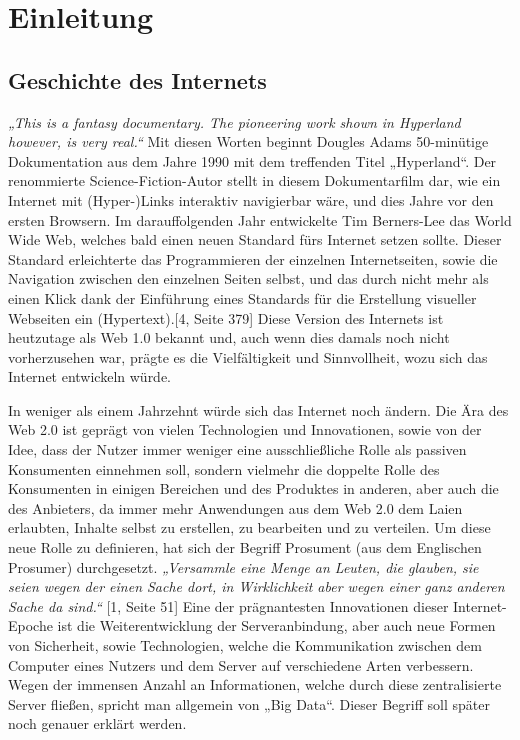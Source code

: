 \chapter{Einleitung}

\section{Geschichte des Internets}

\textit{„This is a fantasy documentary. The pioneering work shown in Hyperland however, is very real.“} \cite{Hyperland}
Mit diesen Worten beginnt Dougles Adams 50-minütige Dokumentation aus dem Jahre 1990 mit dem treffenden Titel „Hyperland“. Der renommierte Science-Fiction-Autor stellt in diesem Dokumentarfilm dar, wie ein Internet mit (Hyper-)Links interaktiv navigierbar wäre, und dies Jahre vor den ersten Browsern.
Im darauffolgenden Jahr entwickelte Tim Berners-Lee das World Wide Web, welches bald einen neuen Standard fürs Internet setzen sollte.
Dieser Standard erleichterte das Programmieren der einzelnen Internetseiten, sowie die Navigation zwischen den einzelnen Seiten selbst, und das durch nicht mehr als einen Klick dank der Einführung eines Standards für die Erstellung visueller Webseiten ein (Hypertext).[4, Seite 379] Diese Version des Internets ist heutzutage als Web 1.0 bekannt und, auch wenn dies damals noch nicht vorherzusehen war, prägte es die Vielfältigkeit und Sinnvollheit, wozu sich das Internet entwickeln würde.

In weniger als einem Jahrzehnt würde sich das Internet noch ändern. Die Ära des Web 2.0 ist geprägt von vielen Technologien und Innovationen, sowie von der Idee, dass der Nutzer immer weniger eine ausschließliche Rolle als passiven Konsumenten einnehmen soll, sondern vielmehr die doppelte Rolle des Konsumenten in einigen Bereichen und des Produktes in anderen, aber auch die des Anbieters, da immer mehr Anwendungen aus dem Web 2.0 dem Laien erlaubten, Inhalte selbst zu erstellen, zu bearbeiten und zu verteilen. Um diese neue Rolle zu definieren, hat sich der Begriff Prosument (aus dem Englischen Prosumer) durchgesetzt.
\textit{„Versammle eine Menge an Leuten, die glauben, sie seien wegen der einen Sache dort, in Wirklichkeit aber wegen einer ganz anderen Sache da sind.“} [1, Seite 51]
Eine der prägnantesten Innovationen dieser Internet-Epoche ist die Weiterentwicklung der Serveranbindung, aber auch neue Formen von Sicherheit, sowie Technologien, welche die Kommunikation zwischen dem Computer eines Nutzers und dem Server auf verschiedene Arten verbessern. Wegen der immensen Anzahl an Informationen, welche durch diese zentralisierte Server fließen, spricht man allgemein von „Big Data“. Dieser Begriff soll später noch genauer erklärt werden.


